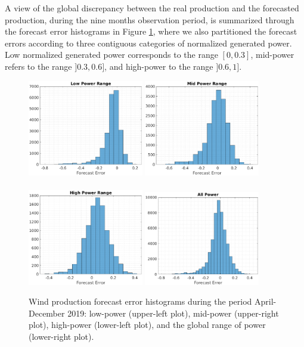 \documentclass[11pt]{article}
\theoremstyle{definition}
\begin{document}
A view of the global discrepancy between the real production and the forecasted production, during the nine months observation period, is summarized through the forecast error histograms in Figure \ref{fig:data_curtailing}, where we also partitioned the forecast errors according to three contiguous categories of normalized generated power. Low normalized generated power corresponds to the range $[0,0.3]$, mid-power refers to the range $]0.3,0.6]$, and high-power to the range $]0.6,1]$.

\begin{figure}[H]
\centering
\includegraphics[width=0.45\textwidth]{plots/LP_6.eps}
\includegraphics[width=0.45\textwidth]{plots/MP_6.eps}\\
\quad\\
\includegraphics[width=0.45\textwidth]{plots/HP_6.eps}
\includegraphics[width=0.45\textwidth]{plots/AP_6.eps}
\caption{Wind production forecast error histograms during the period April-December 2019: low-power (upper-left plot), mid-power (upper-right plot), high-power (lower-left plot), and the global range of power (lower-right plot).}
  \label{fig:data_curtailing}
\end{figure}
\end{document}
